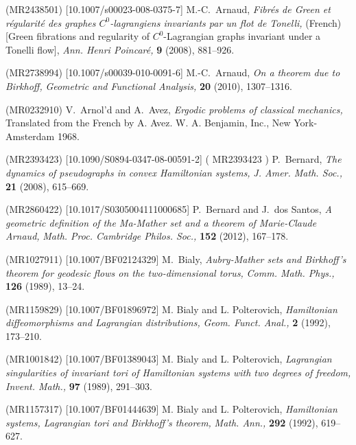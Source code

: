 \documentclass{dcds}
\theoremstyle{definition}
\begin{document}
\begin{thebibliography}{99}

  (MR2438501) [10.1007/s00023-008-0375-7]
\newblock M.-C.~Arnaud,
\newblock \emph{\emph{Fibr\'es de Green et r\'egularit\'e des graphes $C^0$-lagrangiens invariants par un flot de Tonelli,}}
\newblock (French) [Green fibrations and regularity of $C^0$-Lagrangian graphs invariant under a Tonelli flow], \emph{Ann. Henri Poincar\'e,} \textbf{9} (2008), 881--926.

 (MR2738994) [10.1007/s00039-010-0091-6]
\newblock M.-C.~Arnaud,
\newblock \emph{\emph{On a theorem due to Birkhoff,}}
\newblock \emph{Geometric and Functional Analysis,}  \textbf{20} (2010), 1307--1316.

 (MR0232910)
\newblock V.~Arnol'd and A.~Avez,
\newblock \emph{Ergodic problems of classical mechanics,}
\newblock Translated from the French by A. Avez. W. A. Benjamin, Inc., New York-Amsterdam 1968.

 (MR2393423) [10.1090/S0894-0347-08-00591-2] ( MR2393423 )
\newblock P.~Bernard,
\newblock \emph{\emph{The dynamics of pseudographs in convex Hamiltonian systems,}}
\newblock \emph{J. Amer. Math. Soc.,} \textbf{21} (2008),  615--669.

 (MR2860422) [10.1017/S0305004111000685]
\newblock P.~Bernard and J.~dos Santos,
\newblock \emph{\emph{A geometric definition of the Ma-Mather set and a theorem of Marie-Claude Arnaud,}}
\newblock \emph{Math. Proc. Cambridge Philos. Soc.,} \textbf{152} (2012),  167--178.

 (MR1027911) [10.1007/BF02124329]
\newblock M.~Bialy,
\newblock \emph{\emph{Aubry-Mather sets and Birkhoff's theorem for geodesic flows on the two-dimensional torus,}}
\newblock \emph{Comm. Math. Phys.,} \textbf{126} (1989),  13--24.

 (MR1159829) [10.1007/BF01896972]
\newblock M. Bialy and L. Polterovich,
\newblock \emph{\emph{Hamiltonian diffeomorphisms and Lagrangian distributions,}}
\newblock \emph{Geom. Funct. Anal.,} \textbf{2} (1992), 173--210.

 (MR1001842) [10.1007/BF01389043]
\newblock M. Bialy and L. Polterovich,
\newblock \emph{\emph{Lagrangian singularities of invariant tori of Hamiltonian systems with two degrees of freedom,}}
\newblock \emph{Invent. Math.,} \textbf{97} (1989), 291--303.

 (MR1157317) [10.1007/BF01444639]
\newblock M. Bialy and L. Polterovich,
\newblock \emph{\emph{Hamiltonian systems, Lagrangian tori and Birkhoff's theorem,}}
\newblock \emph{Math. Ann.,} \textbf{292} (1992),  619--627.


\end{thebibliography}
\end{document}
